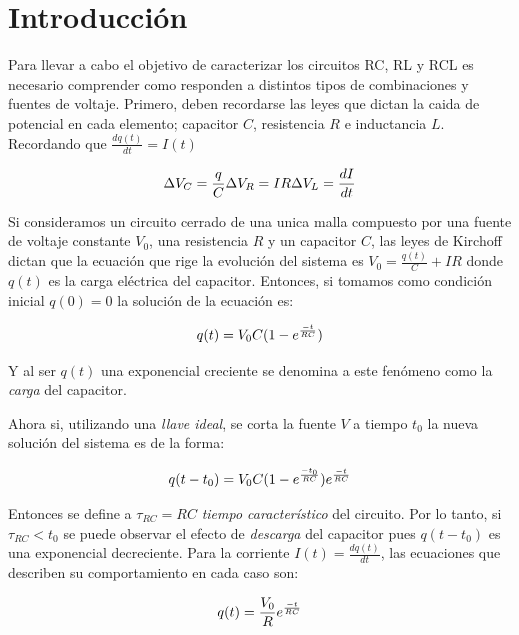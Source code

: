 \documentclass[11pt,a4paper]{article}
\begin{document}
\section{Introducción}\label{sec:intro}
Para llevar a cabo el objetivo de caracterizar los circuitos RC, RL y RCL es necesario comprender como responden a distintos tipos de combinaciones y fuentes de voltaje. Primero, deben recordarse las leyes que dictan la caida de potencial en cada elemento; capacitor $C$, resistencia $R$ e inductancia $L$. Recordando que $\frac{dq(t)}{dt} = I(t)$

\begin{equation}{\label{leyes}}
\Delta V_C = \frac{q}{C}\\
\Delta V_R = IR\\
\Delta V_L = \frac{dI}{dt}
\end{equation}

Si consideramos un circuito cerrado de una unica malla compuesto por una fuente de voltaje constante $V_{0}$, una resistencia $R$ y un capacitor $C$, las leyes de Kirchoff dictan que la ecuación que rige la evolución del sistema es $V_{0} = \frac{q(t)}{C}+IR$ donde $q(t)$ es la carga eléctrica del capacitor. Entonces, si tomamos como condición inicial $q(0)=0$ la solución de la ecuación es:
   
\begin{equation}{\label{RC_carga}}
q(t)=V_{0}C(1-e^\frac{-t}{RC})
\end{equation}

Y al ser $q(t)$ una exponencial creciente se denomina a este fenómeno como la \textit{carga} del capacitor.

Ahora si, utilizando una \textit{llave ideal}, se corta la fuente $V$ a tiempo $t_{0}$ la nueva solución del sistema es de la forma:

\begin{equation}{\label{RC_descarga}}
q(t-t_{0})=V_{0}C(1-e^\frac{-t_{0}}{RC})e^\frac{-t}{RC}
\end{equation}

Entonces se define a $\tau_{RC}=RC$ \textit{tiempo característico} del circuito. Por lo tanto, si $\tau_{RC}<t_{0}$ se puede observar el efecto de \textit{descarga} del capacitor pues $q(t-t_{0})$ es una exponencial decreciente. Para la corriente $I(t) = \frac{dq(t)}{dt}$, las ecuaciones que describen su comportamiento en cada caso son:

\begin{equation}{\label{RC_carga_I}}
q(t)=\frac{V_{0}}{R}e^\frac{-t}{RC}
\end{equation}
\end{document}

